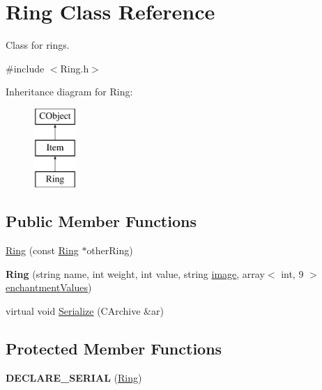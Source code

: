 \hypertarget{class_ring}{}\section{Ring Class Reference}
\label{class_ring}


Class for rings.  




{\ttfamily \#include $<$Ring.\+h$>$}

Inheritance diagram for Ring\+:\begin{figure}[H]
\begin{center}
\leavevmode
\includegraphics[height=3.000000cm]{class_ring}
\end{center}
\end{figure}
\subsection*{Public Member Functions}
\begin{DoxyCompactItemize}
\item 
\hyperlink{class_ring_ab65389fd4a0837c0f82a1b9207ba8330}{Ring} (const \hyperlink{class_ring}{Ring} $\ast$other\+Ring)
\item 
\hypertarget{class_ring_a0baf0ece716fa58742a031579310834b}{}\label{class_ring_a0baf0ece716fa58742a031579310834b} 
{\bfseries Ring} (string name, int weight, int value, string \hyperlink{class_item_add84a42b692ee5d580a92ae4a922f784}{image}, array$<$ int, 9 $>$ \hyperlink{class_item_a8532d8729f9433f41b7fc18b20d83236}{enchantment\+Values})
\item 
virtual void \hyperlink{class_ring_a123e40607e2aa46b27da2228af73eb4a}{Serialize} (C\+Archive \&ar)
\end{DoxyCompactItemize}
\subsection*{Protected Member Functions}
\begin{DoxyCompactItemize}
\item 
\hypertarget{class_ring_a46159bcedc7cf0fc72eec5d75784bed9}{}\label{class_ring_a46159bcedc7cf0fc72eec5d75784bed9} 
{\bfseries D\+E\+C\+L\+A\+R\+E\+\_\+\+S\+E\+R\+I\+AL} (\hyperlink{class_ring}{Ring})
\end{DoxyCompactItemize}
